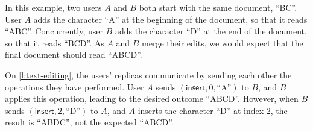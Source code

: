 \begin{frame}
\begin{center}
    \end{center}
\end{frame}
\label{l:text-editing}

In this example, two users $A$ and $B$ both start with the same document, ``BC''.
User $A$ adds the character ``A'' at the beginning of the document, so that it reads ``ABC''.
Concurrently, user $B$ adds the character ``D'' at the end of the document, so that it reads ``BCD''.
As $A$ and $B$ merge their edits, we would expect that the final document should read ``ABCD''.

On \autoref{l:text-editing}, the users' replicas communicate by sending each other the operations they have performed.
User $A$ sends $(\mathsf{insert}, 0, \text{``A''})$ to $B$, and $B$ applies this operation, leading to the desired outcome ``ABCD''.
However, when $B$ sends $(\mathsf{insert}, 2, \text{``D''})$ to $A$, and $A$ inserts the character ``D'' at index 2, the result is ``ABDC'', not the expected ``ABCD''.

